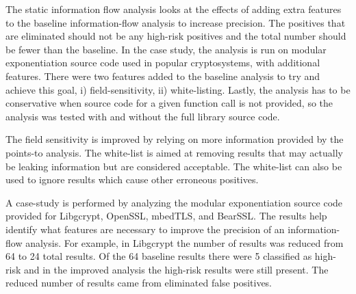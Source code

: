   The static information flow analysis looks at the effects of adding extra
  features to the baseline information-flow analysis to increase precision. The
  positives that are eliminated should not be any high-risk positives and the
  total number should be fewer than the baseline. In the case study, the
  analysis is run on modular exponentiation source code used in popular
  cryptosystems, with additional features. There were two features added to the
  baseline analysis to try and achieve this goal, i) field-sensitivity, ii)
  white-listing. Lastly, the analysis has to be conservative when source code
  for a given function call is not provided, so the analysis was tested with and
  without the full library source code.
  
  The field sensitivity is improved by relying on more information provided by
  the points-to analysis. The white-list is aimed at removing results that may
  actually be leaking information but are considered acceptable. The white-list
  can also be used to ignore results which cause other erroneous positives. 

  A case-study is performed by analyzing the modular exponentiation source code
  provided for Libgcrypt, OpenSSL, mbedTLS, and BearSSL. The results help
  identify what features are necessary to improve the precision of an
  information-flow analysis. For example, in Libgcrypt the number of results was
  reduced from 64 to 24 total results. Of the 64 baseline results there were 5
  classified as high-risk and in the improved analysis the high-risk results
  were still present. The reduced number of results came from eliminated false
  positives.


